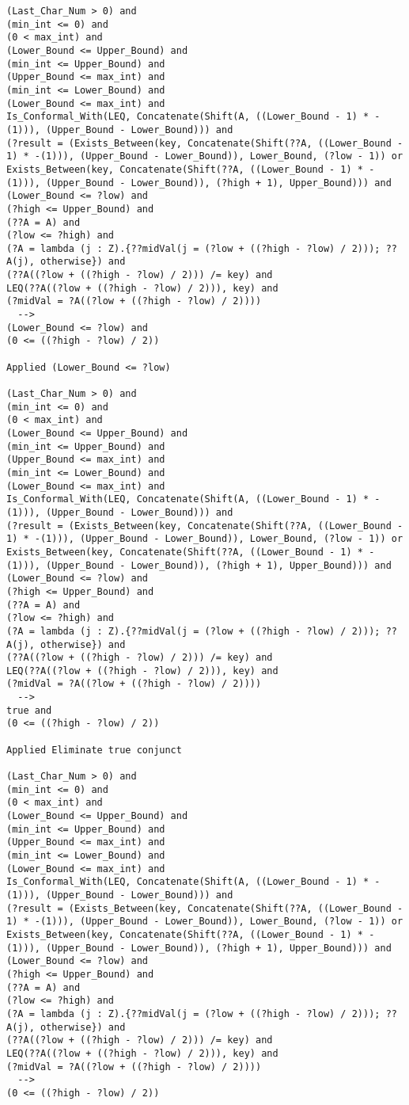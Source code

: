 \begin{lstlisting}[language=resolve]
(Last_Char_Num > 0) and
(min_int <= 0) and
(0 < max_int) and
(Lower_Bound <= Upper_Bound) and
(min_int <= Upper_Bound) and
(Upper_Bound <= max_int) and
(min_int <= Lower_Bound) and
(Lower_Bound <= max_int) and
Is_Conformal_With(LEQ, Concatenate(Shift(A, ((Lower_Bound - 1) * -(1))), (Upper_Bound - Lower_Bound))) and
(?result = (Exists_Between(key, Concatenate(Shift(??A, ((Lower_Bound - 1) * -(1))), (Upper_Bound - Lower_Bound)), Lower_Bound, (?low - 1)) or Exists_Between(key, Concatenate(Shift(??A, ((Lower_Bound - 1) * -(1))), (Upper_Bound - Lower_Bound)), (?high + 1), Upper_Bound))) and
(Lower_Bound <= ?low) and
(?high <= Upper_Bound) and
(??A = A) and
(?low <= ?high) and
(?A = lambda (j : Z).{??midVal(j = (?low + ((?high - ?low) / 2))); ??A(j), otherwise}) and
(??A((?low + ((?high - ?low) / 2))) /= key) and
LEQ(??A((?low + ((?high - ?low) / 2))), key) and
(?midVal = ?A((?low + ((?high - ?low) / 2))))
  -->
(Lower_Bound <= ?low) and
(0 <= ((?high - ?low) / 2))

Applied (Lower_Bound <= ?low)

(Last_Char_Num > 0) and
(min_int <= 0) and
(0 < max_int) and
(Lower_Bound <= Upper_Bound) and
(min_int <= Upper_Bound) and
(Upper_Bound <= max_int) and
(min_int <= Lower_Bound) and
(Lower_Bound <= max_int) and
Is_Conformal_With(LEQ, Concatenate(Shift(A, ((Lower_Bound - 1) * -(1))), (Upper_Bound - Lower_Bound))) and
(?result = (Exists_Between(key, Concatenate(Shift(??A, ((Lower_Bound - 1) * -(1))), (Upper_Bound - Lower_Bound)), Lower_Bound, (?low - 1)) or Exists_Between(key, Concatenate(Shift(??A, ((Lower_Bound - 1) * -(1))), (Upper_Bound - Lower_Bound)), (?high + 1), Upper_Bound))) and
(Lower_Bound <= ?low) and
(?high <= Upper_Bound) and
(??A = A) and
(?low <= ?high) and
(?A = lambda (j : Z).{??midVal(j = (?low + ((?high - ?low) / 2))); ??A(j), otherwise}) and
(??A((?low + ((?high - ?low) / 2))) /= key) and
LEQ(??A((?low + ((?high - ?low) / 2))), key) and
(?midVal = ?A((?low + ((?high - ?low) / 2))))
  -->
true and
(0 <= ((?high - ?low) / 2))

Applied Eliminate true conjunct

(Last_Char_Num > 0) and
(min_int <= 0) and
(0 < max_int) and
(Lower_Bound <= Upper_Bound) and
(min_int <= Upper_Bound) and
(Upper_Bound <= max_int) and
(min_int <= Lower_Bound) and
(Lower_Bound <= max_int) and
Is_Conformal_With(LEQ, Concatenate(Shift(A, ((Lower_Bound - 1) * -(1))), (Upper_Bound - Lower_Bound))) and
(?result = (Exists_Between(key, Concatenate(Shift(??A, ((Lower_Bound - 1) * -(1))), (Upper_Bound - Lower_Bound)), Lower_Bound, (?low - 1)) or Exists_Between(key, Concatenate(Shift(??A, ((Lower_Bound - 1) * -(1))), (Upper_Bound - Lower_Bound)), (?high + 1), Upper_Bound))) and
(Lower_Bound <= ?low) and
(?high <= Upper_Bound) and
(??A = A) and
(?low <= ?high) and
(?A = lambda (j : Z).{??midVal(j = (?low + ((?high - ?low) / 2))); ??A(j), otherwise}) and
(??A((?low + ((?high - ?low) / 2))) /= key) and
LEQ(??A((?low + ((?high - ?low) / 2))), key) and
(?midVal = ?A((?low + ((?high - ?low) / 2))))
  -->
(0 <= ((?high - ?low) / 2))


\end{lstlisting}
